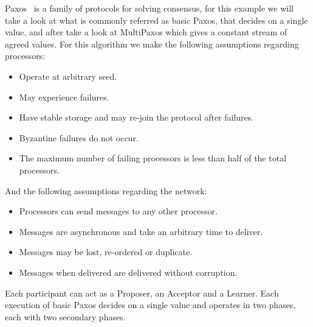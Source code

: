 Paxos~\cite{paxos} is a family of protocols for solving consensus, for this example we will take
a look at what is commonly referred as basic Paxos, that decides on a single value, 
and after take a look at MultiPaxos which gives a constant stream of agreed values. 
For this algorithm we make the following assumptions regarding processors:
\begin{itemize}
  \item Operate at arbitrary seed.
  \item May experience failures.
  \item Have stable storage and may re-join the protocol after failures.
  \item Byzantine failures do not occur.
  \item The maximum number of failing processors is less than half of the total processors.
\end{itemize}
And the following assumptions regarding the network:
\begin{itemize}
  \item Processors can send messages to any other processor.
  \item Messages are asynchronous and take an arbitrary time to deliver.
  \item Messages may be lost, re-ordered or duplicate.
  \item Messages when delivered are delivered without corruption.
\end{itemize}

Each participant can act as a Proposer, an Acceptor and a Learner. Each execution 
of basic Paxos decides on a single value and operates in two phases, each with two
secondary phases.

